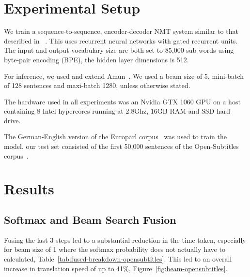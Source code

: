 \documentclass[11pt,a4paper]{article}
\begin{document}
\section{Experimental Setup}
\label{sec:Experimental Setup}

We train a sequence-to-sequence, encoder-decoder NMT system similar to that described in ~\citet{sennrich-haddow-birch:2016:P16-12}. This uses recurrent neural networks with gated recurrent units. The input and output vocabulary size are both set to 85,000 sub-words using byte-pair encoding (BPE), the hidden layer dimensions is 512. %

For inference, we used and extend Amun~\citep{junczys2016neural}. We used a beam size of 5, mini-batch of 128 sentences and maxi-batch 1280, unless otherwise stated.

The hardware used in all experiments was an Nvidia GTX 1060 GPU on a host containing 8 Intel hypercores running at 2.8Ghz, 16GB RAM and SSD hard drive.

The German-English version of the Europarl corpus~\citep{Koehn:2005:MTS} was used to train the model, our test set consisted of the first 50,000 sentences of the Open-Subtitles corpus~\citep{TIEDEMANN12.463}.

\section{Results}
\label{sec:Results}

\subsection{Softmax and Beam Search Fusion}

Fusing the last 3 steps led to a substantial reduction in the time taken, especially for beam size of 1 where the softmax probability does not actually have to calculated, Table~\ref{tab:fused-breakdown-opensubtitles}. This led to an overall increase in translation speed of up to 41\%, Figure~\ref{fig:beam-opensubtitles}. 
\end{document}
